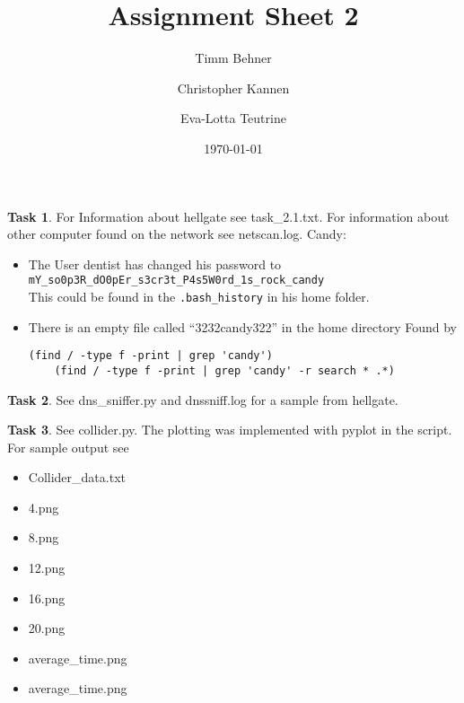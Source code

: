 \documentclass{scrartcl}
\title{Assignment Sheet 2}
\author{Timm Behner \and Christopher Kannen \and Eva-Lotta Teutrine}
\date{\today}
\theoremstyle{definition}
\newtheorem{exercise}{Task}
\begin{document}
\maketitle
\begin{exercise}\hfill
    For Information about hellgate see task\_2.1.txt. For information about
    other computer found on the network see netscan.log.
    Candy:
    \begin{itemize}
        \item The User dentist has changed his password to \\
            \texttt{mY\_so0p3R\_dO0pEr\_s3cr3t\_P4s5W0rd\_1s\_rock\_candy}\\
            This could be found in the \texttt{.bash\_history} in his home
            folder.
        \item There is an empty file called ``3232candy322'' in the home directory
            Found by
            \begin{verbatim}
(find / -type f -print | grep 'candy') 
    (find / -type f -print | grep 'candy' -r search * .*)
            \end{verbatim}
    \end{itemize}
\end{exercise}

\begin{exercise}
    See dns\_sniffer.py and dnssniff.log for a sample from hellgate.
\end{exercise}

\begin{exercise}
    See collider.py. The plotting was implemented with pyplot in the script.
    For sample output see 
    \begin{itemize}
        \item Collider\_data.txt
        \item 4.png
        \item 8.png
        \item 12.png
        \item 16.png
        \item 20.png
        \item average\_time.png
        \item average\_time.png
    \end{itemize}
\end{exercise}
\end{document}
